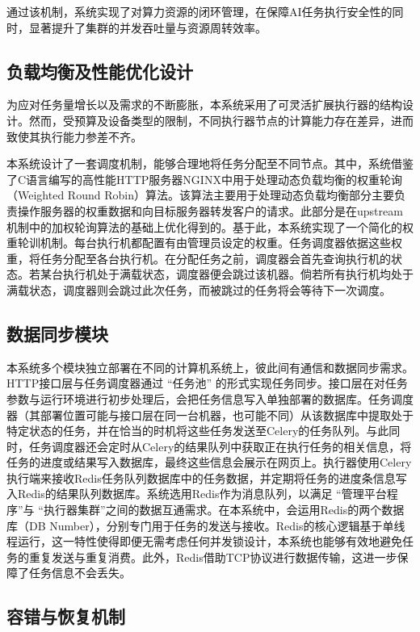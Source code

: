 通过该机制，系统实现了对算力资源的闭环管理，在保障AI任务执行安全性的同时，显著提升了集群的并发吞吐量与资源周转效率。

\subsection{负载均衡及性能优化设计}

为应对任务量增长以及需求的不断膨胀，本系统采用了可灵活扩展执行器的结构设计。然而，受预算及设备类型的限制，不同执行器节点的计算能力存在差异，进而致使其执行能力参差不齐。

本系统设计了一套调度机制，能够合理地将任务分配至不同节点。其中，系统借鉴了C语言编写的高性能HTTP服务器NGINX中用于处理动态负载均衡的权重轮询（Weighted Round Robin）算法。该算法主要用于处理动态负载均衡部分主要负责操作服务器的权重数据和向目标服务器转发客户的请求。此部分是在upstream机制中的加权轮询算法的基础上优化得到的\cite{10}。基于此，本系统实现了一个简化的权重轮训机制。每台执行机都配置有由管理员设定的权重。任务调度器依据这些权重，将任务分配至各台执行机。在分配任务之前，调度器会首先查询执行机的状态。若某台执行机处于满载状态，调度器便会跳过该机器。倘若所有执行机均处于满载状态，调度器则会跳过此次任务，而被跳过的任务将会等待下一次调度。

\subsection{数据同步模块}

本系统多个模块独立部署在不同的计算机系统上，彼此间有通信和数据同步需求。HTTP接口层与任务调度器通过 “任务池” 的形式实现任务同步。接口层在对任务参数与运行环境进行初步处理后，会把任务信息写入单独部署的数据库。任务调度器（其部署位置可能与接口层在同一台机器，也可能不同）从该数据库中提取处于特定状态的任务，并在恰当的时机将这些任务发送至Celery的任务队列。与此同时，任务调度器还会定时从Celery的结果队列中获取正在执行任务的相关信息，将任务的进度或结果写入数据库，最终这些信息会展示在网页上。执行器使用Celery执行端来接收Redis任务队列数据库中的任务数据，并定期将任务的进度条信息写入Redis的结果队列数据库。系统选用Redis作为消息队列，以满足 “管理平台程序”与 “执行器集群”之间的数据互通需求。在本系统中，会运用Redis的两个数据库（DB Number），分别专门用于任务的发送与接收。Redis的核心逻辑基于单线程运行，这一特性使得即便无需考虑任何并发锁设计，本系统也能够有效地避免任务的重复发送与重复消费。此外，Redis借助TCP协议进行数据传输，这进一步保障了任务信息不会丢失。

\subsection{容错与恢复机制}


